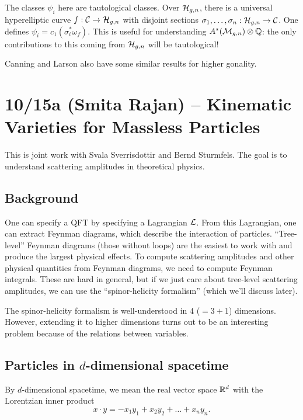 \documentclass{amsart}
\begin{document}
The classes $\psi_i$ here are tautological classes.
Over $\mathcal{H}_{g,n}$, there is a universal hyperelliptic curve $f: \mathcal{C} \to \mathcal{H}_{g,n}$ with disjoint sections $\sigma_1, \dots, \sigma_n: \mathcal{H}_{g,n} \to \mathcal{C}$.
One defines $\psi_i = c_1(\sigma_i^* \omega_f)$.
This is useful for understanding $A^*(\mathcal{M}_{g,n}) \otimes \mathbb{Q}$: the only contributions to this coming from $\mathcal{H}_{g,n}$ will be tautological!

Canning and Larson also have some similar results for higher gonality.

\section{10/15a (Smita Rajan) -- Kinematic Varieties for Massless Particles}

This is joint work with Svala Sverrisdottir and Bernd Sturmfels.
The goal is to understand scattering amplitudes in theoretical physics.

\subsection{Background}

One can specify a QFT by specifying a Lagrangian $\mathcal{L}$.
From this Lagrangian, one can extract Feynman diagrams, which describe the interaction of particles.
``Tree-level'' Feynman diagrams (those without loops) are the easiest to work with and produce the largest physical effects.
To compute scattering amplitudes and other physical quantities from Feynman diagrams, we need to compute Feynman integrals.
These are hard in general, but if we just care about tree-level scattering amplitudes, we can use the ``spinor-helicity formalism'' (which we'll discuss later).

The spinor-helicity formalism is well-understood in $4$ ($=3+1$) dimensions.
However, extending it to higher dimensions turns out to be an interesting problem because of the relations between variables.

\subsection{Particles in $d$-dimensional spacetime}

\begin{dfn}
	By $d$-dimensional spacetime, we mean the real vector space $\mathbb{R}^d$ with the Lorentzian inner product
	\[
		x \cdot y = -x_1 y_1 + x_2 y_2 + \dots + x_n y_n.
	\]
\end{dfn}
\end{document}
